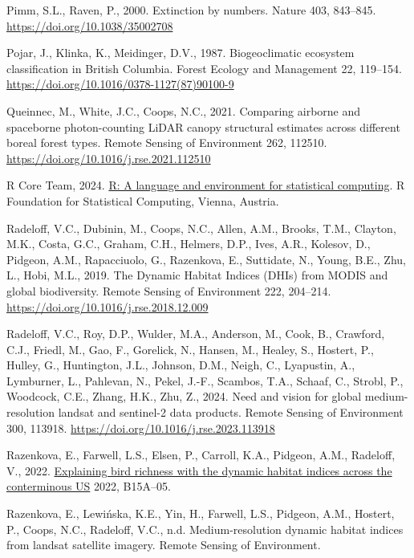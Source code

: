 \documentclass[
]{agujournal2019}
\newlength{\cslhangindent}
\newenvironment{CSLReferences}[2] %
 {\begin{list}{}{%
  \setlength{\itemindent}{0pt}
  \setlength{\leftmargin}{0pt}
  \setlength{\parsep}{0pt}
  \ifodd #1
   \setlength{\leftmargin}{\cslhangindent}
   \setlength{\itemindent}{-1\cslhangindent}
  \fi
  \setlength{\itemsep}{#2\baselineskip}}}
 {\end{list}}
\begin{document}
\begin{CSLReferences}{1}{0}
Pimm, S.L., Raven, P., 2000. Extinction by numbers. Nature 403,
843--845. \url{https://doi.org/10.1038/35002708}

Pojar, J., Klinka, K., Meidinger, D.V., 1987. Biogeoclimatic ecosystem
classification in British Columbia. Forest Ecology and Management 22,
119--154. \url{https://doi.org/10.1016/0378-1127(87)90100-9}

Queinnec, M., White, J.C., Coops, N.C., 2021. Comparing airborne and
spaceborne photon-counting LiDAR canopy structural estimates across
different boreal forest types. Remote Sensing of Environment 262,
112510. \url{https://doi.org/10.1016/j.rse.2021.112510}

R Core Team, 2024. \href{https://www.R-project.org/}{R: A language and
environment for statistical computing}. R Foundation for Statistical
Computing, Vienna, Austria.

Radeloff, V.C., Dubinin, M., Coops, N.C., Allen, A.M., Brooks, T.M.,
Clayton, M.K., Costa, G.C., Graham, C.H., Helmers, D.P., Ives, A.R.,
Kolesov, D., Pidgeon, A.M., Rapacciuolo, G., Razenkova, E., Suttidate,
N., Young, B.E., Zhu, L., Hobi, M.L., 2019. The Dynamic Habitat Indices
(DHIs) from MODIS and global biodiversity. Remote Sensing of Environment
222, 204--214. \url{https://doi.org/10.1016/j.rse.2018.12.009}

Radeloff, V.C., Roy, D.P., Wulder, M.A., Anderson, M., Cook, B.,
Crawford, C.J., Friedl, M., Gao, F., Gorelick, N., Hansen, M., Healey,
S., Hostert, P., Hulley, G., Huntington, J.L., Johnson, D.M., Neigh, C.,
Lyapustin, A., Lymburner, L., Pahlevan, N., Pekel, J.-F., Scambos, T.A.,
Schaaf, C., Strobl, P., Woodcock, C.E., Zhang, H.K., Zhu, Z., 2024. Need
and vision for global medium-resolution landsat and sentinel-2 data
products. Remote Sensing of Environment 300, 113918.
\url{https://doi.org/10.1016/j.rse.2023.113918}

Razenkova, E., Farwell, L.S., Elsen, P., Carroll, K.A., Pidgeon, A.M.,
Radeloff, V., 2022.
\href{https://ui.adsabs.harvard.edu/abs/2022AGUFM.B15A..05R}{Explaining
bird richness with the dynamic habitat indices across the conterminous
US} 2022, B15A--05.

Razenkova, E., Lewińska, K.E., Yin, H., Farwell, L.S., Pidgeon, A.M.,
Hostert, P., Coops, N.C., Radeloff, V.C., n.d. Medium-resolution dynamic
habitat indices from landsat satellite imagery. Remote Sensing of
Environment.


\end{CSLReferences}
\end{document}
